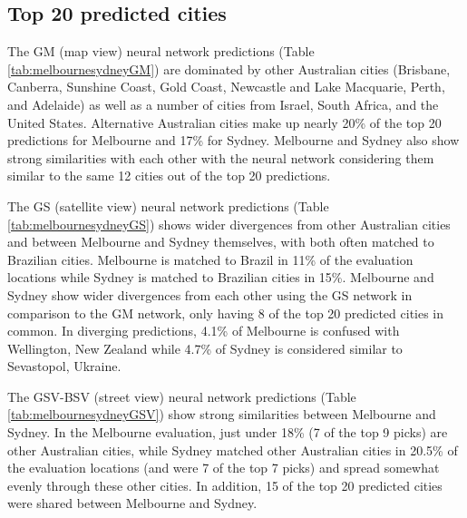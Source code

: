 \documentclass[Crown,sageh,times]{sagej}
\begin{document}
\subsection{Top 20 predicted cities} 

The GM (map view) neural network predictions (Table \ref{tab:melbournesydneyGM}) are dominated by other Australian cities (Brisbane, Canberra, Sunshine Coast, Gold Coast, Newcastle and Lake Macquarie, Perth, and Adelaide) as well as a number of cities from Israel, South Africa, and the United States. Alternative Australian cities make up nearly 20\% of the top 20 predictions for Melbourne and 17\% for Sydney. Melbourne and Sydney also show strong similarities with each other with the neural network considering them similar to the same 12 cities out of the top 20 predictions.


The GS (satellite view) neural network predictions (Table \ref{tab:melbournesydneyGS}) shows wider divergences from other Australian cities and between Melbourne and Sydney themselves, with both often matched to Brazilian cities. Melbourne is matched to Brazil in 11\% of the evaluation locations while Sydney is matched to Brazilian cities in 15\%. Melbourne and Sydney show wider divergences from each other using the GS network in comparison to the GM network, only having 8 of the top 20 predicted cities in common. In diverging predictions, 4.1\% of Melbourne is confused with Wellington, New Zealand while 4.7\% of Sydney is considered similar to Sevastopol, Ukraine. 


The GSV-BSV (street view) neural network predictions (Table \ref{tab:melbournesydneyGSV}) show strong similarities between Melbourne and Sydney. In the Melbourne evaluation, just under 18\% (7 of the top 9 picks) are other Australian cities, while Sydney matched other Australian cities in 20.5\% of the evaluation locations (and were 7 of the top 7 picks) and spread somewhat evenly through these other cities. In addition, 15 of the top 20 predicted cities were shared between Melbourne and Sydney.
\end{document}
